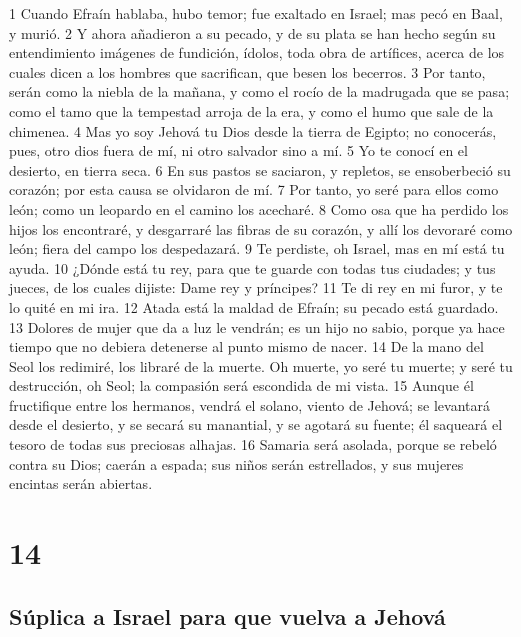 1 Cuando Efraín hablaba, hubo temor; fue exaltado en Israel; mas pecó en Baal, y murió.
2 Y ahora añadieron a su pecado, y de su plata se han hecho según su entendimiento imágenes de fundición, ídolos, toda obra de artífices, acerca de los cuales dicen a los hombres que sacrifican, que besen los becerros.
3 Por tanto, serán como la niebla de la mañana, y como el rocío de la madrugada que se pasa; como el tamo que la tempestad arroja de la era, y como el humo que sale de la chimenea.
4 Mas yo soy Jehová tu Dios desde la tierra de Egipto; no conocerás, pues, otro dios fuera de mí, ni otro salvador sino a mí.
5 Yo te conocí en el desierto, en tierra seca.
6 En sus pastos se saciaron, y repletos, se ensoberbeció su corazón; por esta causa se olvidaron de mí.
7 Por tanto, yo seré para ellos como león; como un leopardo en el camino los acecharé.
8 Como osa que ha perdido los hijos los encontraré, y desgarraré las fibras de su corazón, y allí los devoraré como león; fiera del campo los despedazará.
9 Te perdiste, oh Israel, mas en mí está tu ayuda.
10 ¿Dónde está tu rey, para que te guarde con todas tus ciudades; y tus jueces, de los cuales dijiste: Dame rey y príncipes?
11 Te di rey en mi furor, y te lo quité en mi ira. 
12 Atada está la maldad de Efraín; su pecado está guardado.
13 Dolores de mujer que da a luz le vendrán; es un hijo no sabio, porque ya hace tiempo que no debiera detenerse al punto mismo de nacer.
14 De la mano del Seol los redimiré, los libraré de la muerte. Oh muerte, yo seré tu muerte; y seré tu destrucción, oh Seol; la compasión será escondida de mi vista.
15 Aunque él fructifique entre los hermanos, vendrá el solano, viento de Jehová; se levantará desde el desierto, y se secará su manantial, y se agotará su fuente; él saqueará el tesoro de todas sus preciosas alhajas.
16 Samaria será asolada, porque se rebeló contra su Dios; caerán a espada; sus niños serán estrellados, y sus mujeres encintas serán abiertas.

\chapter{14}

\section*{Súplica a Israel para que vuelva a Jehová}

